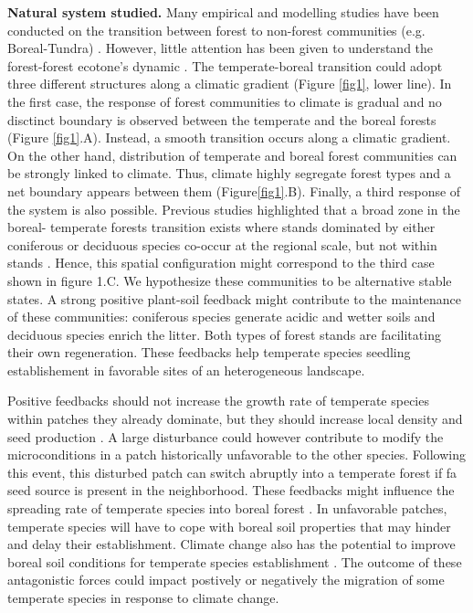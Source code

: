 \textbf{Natural system studied.} Many empirical and modelling studies have
been conducted on the transition between forest to non-forest communities
(e.g. Boreal-Tundra) \cite{Scheffer2012,Scheffer2001,Hirota2011,Messaoud2007}.
However, little attention has been given to understand the forest-forest
ecotone's dynamic \cite{Goldblum2010,Graignic2013,Messaoud2007}.  The
temperate-boreal transition could adopt three different structures along a
climatic gradient (Figure \ref{fig1}, lower line). In the first case, the
response of forest communities to climate is gradual and no disctinct boundary
is observed between the temperate and the boreal forests (Figure
\ref{fig1}.A). Instead, a smooth transition occurs along a climatic gradient. On the other hand,
distribution of temperate and boreal forest communities can be strongly linked
to climate. Thus, climate highly segregate forest types and a net boundary
appears between them (Figure\ref{fig1}.B).  Finally, a third response 
of the system is also possible. Previous studies highlighted that a broad zone
in the boreal- temperate forests transition exists where stands dominated by
either coniferous or deciduous species co-occur at the regional scale, but not within stands
\cite{Goldblum2010,Fisichelli2013}. Hence, this spatial configuration might
correspond to the third case shown in figure 1.C. We hypothesize these
communities to be alternative stable states. A strong positive plant-soil
feedback might contribute to the maintenance of these communities: coniferous
species generate acidic and wetter soils and deciduous species enrich the
litter. Both types of forest stands are facilitating their own regeneration.  
These feedbacks help temperate species
seedling establishement in favorable sites of an heterogeneous landscape.

Positive feedbacks should not increase the growth rate of temperate
species within patches they already dominate, but they should increase local
density and seed production \cite{Levine2006}. A large disturbance could
however contribute to modify the microconditions in a patch historically unfavorable
to the other species. Following this event, this disturbed patch can switch
abruptly into a temperate forest if fa seed source is present in
the neighborhood. These feedbacks might influence the spreading rate of
temperate species into boreal forest \cite{Levine2006}. In unfavorable
patches, temperate species will have to cope with boreal soil properties that
may hinder and delay their establishment. Climate change also has the
potential to improve boreal soil conditions for temperate species
establishment \cite{Lafleur2010}. The outcome of these antagonistic forces
could impact postively or negatively the migration of some temperate species
in response to climate change.

